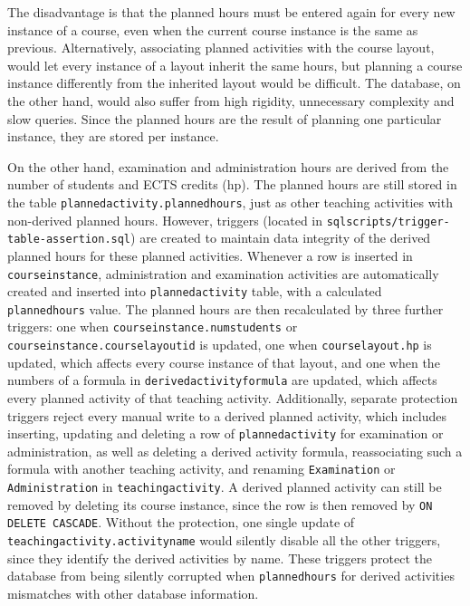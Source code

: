 \documentclass[a4paper]{scrartcl}
\renewcommand{\_}{\textunderscore\allowbreak}
\begin{document}
The disadvantage is that the planned hours must be entered again for every new instance of a course, even when the current course instance is the same as previous. Alternatively, associating planned activities with the course layout, would let every instance of a layout inherit the same hours, but planning a course instance differently from the inherited layout would be difficult. The database, on the other hand, would also suffer from high rigidity, unnecessary complexity and slow queries. Since the planned hours are the result of planning one particular instance, they are stored per instance.

On the other hand, examination and administration hours are derived from the number of students and ECTS credits (hp). The planned hours are still stored in the table \texttt{planned\_activity.planned\_hours}, just as other teaching activities with non-derived planned hours. However, triggers (located in \texttt{sql\_scripts/trigger-table-assertion.sql}) are created to maintain data integrity of the derived planned hours for these planned activities. Whenever a row is inserted in \texttt{course\_instance}, administration and examination activities are automatically created and inserted into \texttt{planned\_activity} table, with a calculated \texttt{planned\_hours} value. The planned hours are then recalculated by three further triggers: one when \texttt{course\_instance.num\_students} or \texttt{course\_instance.course\_layout\_id} is updated, one when \texttt{course\_layout.hp} is updated, which affects every course instance of that layout, and one when the numbers of a formula in \texttt{derived\_activity\_formula} are updated, which affects every planned activity of that teaching activity. Additionally, separate protection triggers reject every manual write to a derived planned activity, which includes inserting, updating and deleting a row of \texttt{planned\_activity} for examination or administration, as well as deleting a derived activity formula, reassociating such a formula with another teaching activity, and renaming \texttt{Examination} or \texttt{Administration} in \texttt{teaching\_activity}. A derived planned activity can still be removed by deleting its course instance, since the row is then removed by \texttt{ON DELETE CASCADE}. Without the protection, one single update of \texttt{teaching\_activity.activity\_name} would silently disable all the other triggers, since they identify the derived activities by name. These triggers protect the database from being silently corrupted when \texttt{planned\_hours} for derived activities mismatches with other database information. 
\end{document}
